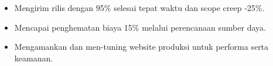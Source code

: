 \vspace{4pt}
\begin{itemize}
  \item Mengirim rilis dengan 95\% selesai tepat waktu dan scope creep -25\%.
  \item Mencapai penghematan biaya 15\% melalui perencanaan sumber daya.
\end{itemize}
\vspace{4pt}
\begin{itemize}
  \item Mengamankan dan men-tuning website produksi untuk performa serta keamanan.
\end{itemize}